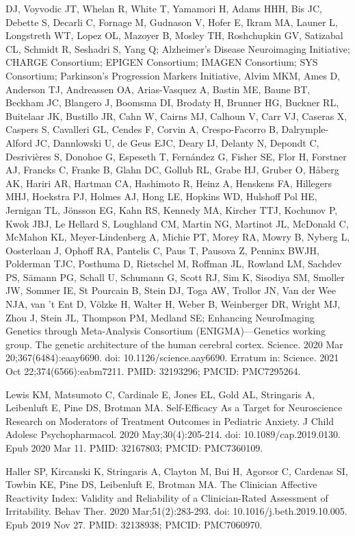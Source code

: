 \documentclass[
]{article}
\begin{document}
DJ, Voyvodic JT, Whelan R, White T, Yamamori H, Adams HHH, Bis JC,
Debette S, Decarli C, Fornage M, Gudnason V, Hofer E, Ikram MA, Launer
L, Longstreth WT, Lopez OL, Mazoyer B, Mosley TH, Roshchupkin GV,
Satizabal CL, Schmidt R, Seshadri S, Yang Q; Alzheimer's Disease
Neuroimaging Initiative; CHARGE Consortium; EPIGEN Consortium; IMAGEN
Consortium; SYS Consortium; Parkinson's Progression Markers Initiative,
Alvim MKM, Ames D, Anderson TJ, Andreassen OA, Arias-Vasquez A, Bastin
ME, Baune BT, Beckham JC, Blangero J, Boomsma DI, Brodaty H, Brunner HG,
Buckner RL, Buitelaar JK, Bustillo JR, Cahn W, Cairns MJ, Calhoun V,
Carr VJ, Caseras X, Caspers S, Cavalleri GL, Cendes F, Corvin A,
Crespo-Facorro B, Dalrymple-Alford JC, Dannlowski U, de Geus EJC, Deary
IJ, Delanty N, Depondt C, Desrivières S, Donohoe G, Espeseth T,
Fernández G, Fisher SE, Flor H, Forstner AJ, Francks C, Franke B, Glahn
DC, Gollub RL, Grabe HJ, Gruber O, Håberg AK, Hariri AR, Hartman CA,
Hashimoto R, Heinz A, Henskens FA, Hillegers MHJ, Hoekstra PJ, Holmes
AJ, Hong LE, Hopkins WD, Hulshoff Pol HE, Jernigan TL, Jönsson EG, Kahn
RS, Kennedy MA, Kircher TTJ, Kochunov P, Kwok JBJ, Le Hellard S,
Loughland CM, Martin NG, Martinot JL, McDonald C, McMahon KL,
Meyer-Lindenberg A, Michie PT, Morey RA, Mowry B, Nyberg L, Oosterlaan
J, Ophoff RA, Pantelis C, Paus T, Pausova Z, Penninx BWJH, Polderman
TJC, Posthuma D, Rietschel M, Roffman JL, Rowland LM, Sachdev PS, Sämann
PG, Schall U, Schumann G, Scott RJ, Sim K, Sisodiya SM, Smoller JW,
Sommer IE, St Pourcain B, Stein DJ, Toga AW, Trollor JN, Van der Wee
NJA, van 't Ent D, Völzke H, Walter H, Weber B, Weinberger DR, Wright
MJ, Zhou J, Stein JL, Thompson PM, Medland SE; Enhancing NeuroImaging
Genetics through Meta-Analysis Consortium (ENIGMA)---Genetics working
group. The genetic architecture of the human cerebral cortex. Science.
2020 Mar 20;367(6484):eaay6690. doi: 10.1126/science.aay6690. Erratum
in: Science. 2021 Oct 22;374(6566):eabm7211. PMID: 32193296; PMCID:
PMC7295264.

Lewis KM, Matsumoto C, Cardinale E, Jones EL, Gold AL, Stringaris A,
Leibenluft E, Pine DS, Brotman MA. Self-Efficacy As a Target for
Neuroscience Research on Moderators of Treatment Outcomes in Pediatric
Anxiety. J Child Adolesc Psychopharmacol. 2020 May;30(4):205-214. doi:
10.1089/cap.2019.0130. Epub 2020 Mar 11. PMID: 32167803; PMCID:
PMC7360109.

Haller SP, Kircanski K, Stringaris A, Clayton M, Bui H, Agorsor C,
Cardenas SI, Towbin KE, Pine DS, Leibenluft E, Brotman MA. The Clinician
Affective Reactivity Index: Validity and Reliability of a
Clinician-Rated Assessment of Irritability. Behav Ther. 2020
Mar;51(2):283-293. doi: 10.1016/j.beth.2019.10.005. Epub 2019 Nov 27.
PMID: 32138938; PMCID: PMC7060970.
\end{document}
